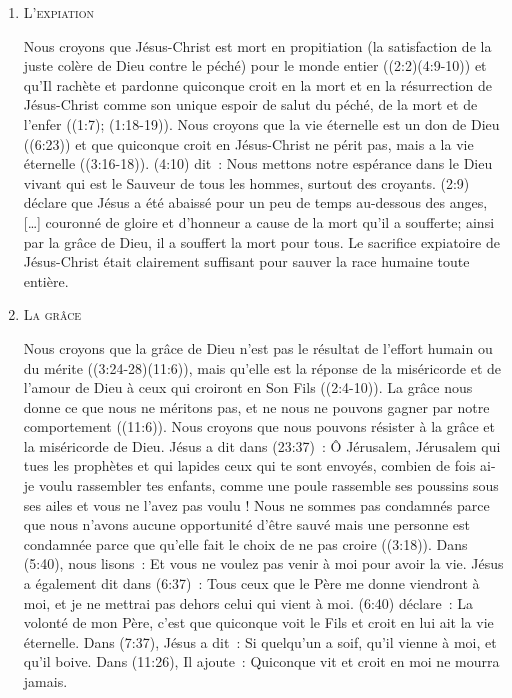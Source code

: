 \begin{enumerate}
  \item  \textsc{L'expiation}

Nous croyons que Jésus-Christ est mort en propitiation
 (la satisfaction de la juste colère de Dieu contre le péché)
 \og pour le monde entier \fg{} ((2:2)(4:9-10))
 et qu'Il rachète et pardonne quiconque croit en la mort et en la résurrection
 de Jésus-Christ comme son unique espoir de salut du péché, 
 de la mort et de l'enfer ((1:7); (1:18-19)).
 Nous croyons que la vie éternelle est un don de Dieu ((6:23))
 et que \og quiconque croit \fg{} en Jésus-Christ ne périt pas,
 mais a la vie éternelle ((3:16-18)).
 (4:10) dit~:
 \og Nous mettons notre espérance dans le Dieu vivant qui est le Sauveur de tous les hommes,
 surtout des croyants. \fg{}
 (2:9) déclare que Jésus \og a été abaissé pour un peu de temps au-dessous des anges,
 [\dots{}] couronné de gloire et d'honneur a cause de la mort qu'il a soufferte;
 ainsi par la grâce de Dieu, il a souffert la mort pour tous. \fg{}
 Le sacrifice expiatoire de Jésus-Christ était clairement suffisant pour sauver
 la race humaine toute entière.


  \item  \textsc{La grâce}

Nous croyons que la grâce de Dieu n'est pas le résultat de l'effort humain ou du mérite
 ((3:24-28)(11:6)), mais qu'elle est la réponse
 de la miséricorde et de l'amour de Dieu à ceux qui croiront en Son Fils
 ((2:4-10)).
 La grâce nous donne 
 ce que nous ne méritons pas, et ne nous ne pouvons gagner par notre comportement
 ((11:6)).
 Nous croyons que nous pouvons résister à la grâce et la miséricorde de Dieu.
 Jésus a dit dans (23:37)~:
 \og Ô Jérusalem, Jérusalem qui tues les prophètes
 et qui lapides ceux qui te sont envoyés, combien de fois ai-je voulu rassembler tes enfants,
 comme une poule rassemble ses poussins sous ses ailes et vous ne l'avez pas voulu ! \fg{}
 Nous ne sommes pas condamnés parce que nous n'avons aucune opportunité d'être sauvé
 mais une personne est condamnée parce que qu'elle fait le choix de ne pas croire
 ((3:18)).
 Dans (5:40), nous lisons~:
 \og Et vous ne voulez pas venir à moi pour avoir la vie. \fg{}
 Jésus a également dit dans (6:37)~:
 \og Tous ceux que le Père me donne viendront à moi,
 et je ne mettrai pas dehors celui qui vient à moi. \fg{}
 (6:40) déclare~:
 \og La volonté de mon Père, c'est que quiconque voit le Fils
 et croit en lui ait la vie éternelle. \fg{}
 Dans (7:37), Jésus a dit~:
 \og Si quelqu'un a soif, qu'il vienne à moi, et qu'il boive. \fg{}
 Dans (11:26), Il ajoute~:
 \og Quiconque vit et croit en moi ne mourra jamais. \fg{}


\end{enumerate}
